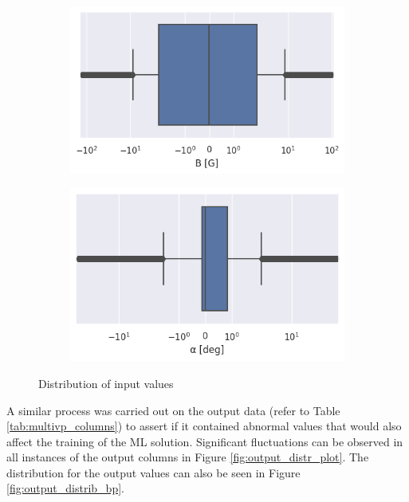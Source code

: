 \begin{figure}[ht]
     \centering
     \begin{subfigure}[b]{0.32\textwidth}
         \centering
         \includegraphics[width=\textwidth]{figures/magnetic_field_boxplot.png}
     \end{subfigure}
     \hfill
     \begin{subfigure}[b]{0.32\textwidth}
         \centering
         \includegraphics[width=\textwidth]{figures/inclination_bp.png}
     \end{subfigure}
     \hfill
        \caption{Distribution of input values}
        \label{fig:input_distrib_bp}
\end{figure}

A similar process was carried out on the output data (refer to Table \ref{tab:multivp_columns}) to assert if it contained abnormal values that would also affect the training of the ML solution. Significant fluctuations can be observed in all instances of the output columns in Figure \ref{fig:output_distr_plot}. The distribution for the output values can also be seen in Figure \ref{fig:output_distrib_bp}.


